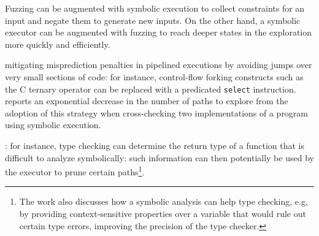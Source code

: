  Fuzzing can be augmented with symbolic execution to collect constraints for an input and negate them to generate new inputs. On the other hand, a symbolic executor can be augmented with fuzzing to reach deeper states in the exploration more quickly and efficiently. 


 mitigating misprediction penalties in pipelined executions by avoiding jumps over very small sections of code: for instance, control-flow forking constructs such as the C ternary operator can be replaced with a predicated {\tt select} instruction. \cite{CCK-EUROSYS11} reports an exponential decrease in the number of paths to explore from the adoption of this strategy when cross-checking two implementations of a program using symbolic execution. %

:  for instance, type checking can determine the return type of a function that is difficult to analyze symbolically: such information can then potentially be used by the executor to prune certain paths\footnote{The work also discusses how a symbolic analysis can help type checking, e.g, by providing context-sensitive properties over a variable that would rule out certain type errors, improving the precision of the type checker.}.

